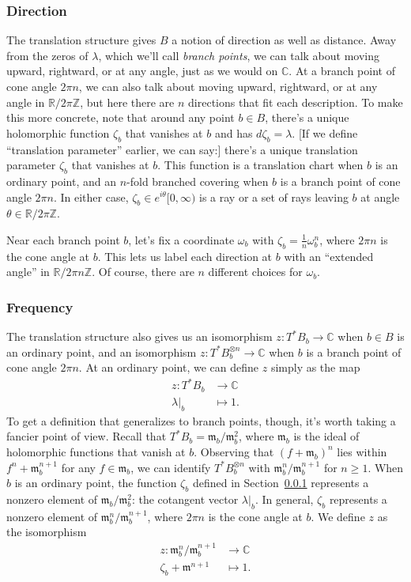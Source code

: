 \documentclass{article}
\theoremstyle{definition}
\newcommand{\maps}{\colon}
\newcommand{\Z}{\mathbb{Z}}
\newcommand{\R}{\mathbb{R}}
\newcommand{\C}{\mathbb{C}}
\newcommand{\van}{\mathfrak{m}}
\begin{document}
\subsubsection{Direction}\label{transl:dir}
The translation structure gives $B$ a notion of direction as well as distance. Away from the zeros of $\lambda$, which we'll call {\em branch points}, we can talk about moving upward, rightward, or at any angle, just as we would on $\C$. At a branch point of cone angle $2\pi n$, we can also talk about moving upward, rightward, or at any angle in $\R/2\pi\Z$, but here there are $n$ directions that fit each description. To make this more concrete, note that around any point $b \in B$, there's a unique holomorphic function $\zeta_b$ that vanishes at $b$ and has $d\zeta_b = \lambda$. \textcolor{VioletRed}{[If we define ``translation parameter'' earlier, we can say:] there's a unique translation parameter $\zeta_b$ that vanishes at $b$.} This function is a translation chart when $b$ is an ordinary point, and an $n$-fold branched covering when $b$ is a branch point of cone angle $2\pi n$. In either case, $\zeta_b \in e^{i\theta} [0, \infty)$ is a ray or a set of rays leaving $b$ at angle $\theta \in \R/2\pi\Z$.

Near each branch point $b$, let's fix a coordinate $\omega_b$ with $\zeta_b = \tfrac{1}{n} \omega_b^n$, where $2\pi n$ is the cone angle at $b$. This lets us label each direction at $b$ with an ``extended angle'' in $\R/2\pi n\Z$. Of course, there are $n$ different choices for $\omega_b$.
\subsubsection{Frequency}\label{transl-freq}
The translation structure also gives us an isomorphism $z \maps T^*B_b \to \C$ when $b \in B$ is an ordinary point, and an isomorphism $z \maps T^*B_b^{\otimes n} \to \C$ when $b$ is a branch point of cone angle $2\pi n$. At an ordinary point, we can define $z$ simply as the map
\begin{align*}
z \maps T^*B_b & \to \C \\
\lambda\big|_b & \mapsto 1.
\end{align*}
To get a definition that generalizes to branch points, though, it's worth taking a fancier point of view. Recall that $T^*B_b = \van_b / \van_b^2$, where $\van_b$ is the ideal of holomorphic functions that vanish at $b$. Observing that $(f + \van_b)^n$ lies within $f^n + \van_b^{n+1}$ for any $f \in \van_b$, we can identify $T^*B_b^{\otimes n}$ with $\van_b^n / \van_b^{n+1}$ for $n \ge 1$. When $b$ is an ordinary point, the function $\zeta_b$ defined in Section~\ref{transl:dir} represents a nonzero element of $\van_b / \van_b^2$: the cotangent vector $\lambda\big|_b$. In general, $\zeta_b$ represents a nonzero element of $\van_b^n / \van_b^{n+1}$, where $2\pi n$ is the cone angle at $b$. We define $z$ as the isomorphism
\begin{align*}
z \maps \van_b^n / \van_b^{n+1} & \to \C \\
\zeta_b + \van^{n+1} & \mapsto 1.
\end{align*}
\end{document}
